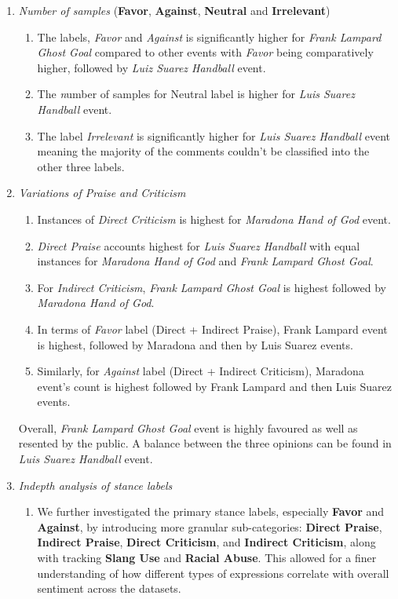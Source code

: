\documentclass[sigconf, review]{acmart}
\begin{document}
\begin{enumerate}
    \item \textit{Number of samples} (\textbf{Favor}, \textbf{Against}, \textbf{Neutral} and \textbf{Irrelevant})
    \begin{enumerate}
    \item The labels, \textit{Favor} and \textit{Against} is significantly higher for  \textit{Frank Lampard Ghost Goal} compared to other events with \textit{Favor} being comparatively higher, followed by \textit{Luiz Suarez Handball} event.
    \item The \textit number of samples for {Neutral} label is higher for \textit{Luis Suarez Handball} event.
    \item The label \textit{Irrelevant} is significantly higher for \textit{Luis Suarez Handball} event meaning the majority of the comments couldn't be classified into the other three labels.
   
    \end{enumerate}
    \item \textit{Variations of Praise and Criticism}
    \begin{enumerate}
        \item Instances of \textit{Direct Criticism} is highest for \textit{Maradona Hand of God} event.
        \item \textit{Direct Praise} accounts highest for \textit{Luis Suarez Handball} with equal instances for \textit{Maradona Hand of God} and \textit{Frank Lampard Ghost Goal}.
        \item For \textit{Indirect Criticism}, \textit{Frank Lampard Ghost Goal} is highest followed by \textit{Maradona Hand of God}.
        \item In terms of \textit{Favor} label (Direct + Indirect Praise), Frank Lampard event is highest, followed by Maradona and then by Luis Suarez events.
        \item  Similarly, for \textit{Against} label (Direct + Indirect Criticism), Maradona event's count is highest followed by Frank Lampard and then Luis Suarez events.
    
    \end{enumerate}
    
     Overall, \textit{Frank Lampard Ghost Goal} event is highly favoured as well as resented by the public. A balance between the three opinions can be found in \textit{Luis Suarez Handball} event.



\item \textit{Indepth analysis of stance labels}
        \begin{enumerate}
            \item We further investigated the primary stance labels, especially \textbf{Favor} and \textbf{Against}, by introducing more granular sub-categories: \textbf{Direct Praise}, \textbf{Indirect Praise}, \textbf{Direct Criticism}, and \textbf{Indirect Criticism}, along with tracking \textbf{Slang Use} and \textbf{Racial Abuse}. This allowed for a finer understanding of how different types of expressions correlate with overall sentiment across the datasets.


\end{enumerate}
\end{enumerate}
\end{document}
